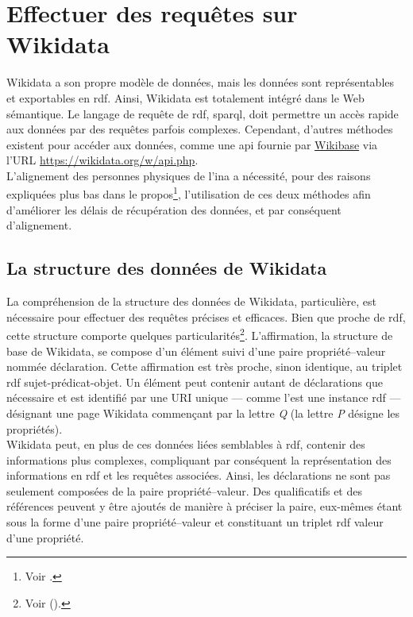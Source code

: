 \section{\label{II-C-1}Effectuer des requêtes sur Wikidata}

Wikidata a son propre modèle de données, mais les données sont représentables et exportables en \ac{rdf}. Ainsi, Wikidata est totalement intégré dans le Web sémantique. Le langage de requête de \ac{rdf}, \ac{sparql}, doit permettre un accès rapide aux données par des requêtes parfois complexes. Cependant, d'autres méthodes existent pour accéder aux données, comme une \ac{api} fournie par \href{https://www.mediawiki.org/wiki/Wikibase/API}{Wikibase} via l'URL \url{https://wikidata.org/w/api.php}.\\

L'alignement des personnes physiques de l'\ac{ina} a nécessité, pour des raisons expliquées plus bas dans le propos\footnote{Voir .}, l'utilisation de ces deux méthodes afin d'améliorer les délais de récupération des données, et par conséquent d'alignement.

\subsection{\label{II-C-1-a}La structure des données de Wikidata}

La compréhension de la structure des données de Wikidata, particulière, est nécessaire pour effectuer des requêtes précises et efficaces. Bien que proche de \ac{rdf}, cette structure comporte quelques particularités\footnote{Voir  ().}. L'affirmation, la structure de base de Wikidata, se compose d'un élément suivi d'une paire propriété--valeur nommée déclaration. Cette affirmation est très proche, sinon identique, au triplet \ac{rdf} sujet-prédicat-objet. Un élément peut contenir autant de déclarations que nécessaire et est identifié par une URI unique --- comme l'est une instance \ac{rdf} --- désignant une page Wikidata commençant par la lettre \textit{Q} (la lettre \textit{P} désigne les propriétés).\\

Wikidata peut, en plus de ces données liées semblables à \ac{rdf}, contenir des informations plus complexes, compliquant par conséquent la représentation des informations en \ac{rdf} et les requêtes associées. Ainsi, les déclarations ne sont pas seulement composées de la paire propriété--valeur. Des qualificatifs et des références peuvent y être ajoutés de manière à préciser la paire, eux-mêmes étant sous la forme d'une paire propriété--valeur et constituant un triplet \ac{rdf} valeur d'une propriété.\\

